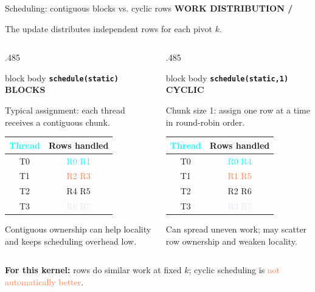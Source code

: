 \documentclass[aspectratio=169,10pt]{beamer}
\newcommand{\eyebrow}[1]{%
  {\color{cyan}\scriptsize\bfseries #1}\par\vspace{.08cm}}
\newcommand{\smallmuted}[1]{{\color{muted}\small #1}}
\newcommand{\cardtitle}[2]{%
  {\color{#1}\bfseries\small #2}\par\vspace{.08cm}}
\begin{document}
\begin{frame}{Scheduling: contiguous blocks vs. cyclic rows}
  \eyebrow{WORK DISTRIBUTION \quad / }
  {\smallmuted{The update distributes independent rows for each pivot $k$.}}
  \vspace{.1cm}

  \begin{columns}[T,onlytextwidth]
    \begin{column}{.485\textwidth}
      \begin{beamercolorbox}[rounded=true,sep=.2cm,wd=\textwidth]{block body}
        \cardtitle{cyan}{\texttt{schedule(static)} \quad BLOCKS}
        \smallmuted{Typical assignment: each thread receives a contiguous chunk.}
        \vspace{.06cm}
        \begin{center}
          \begin{tabular}{c|c}
            \textcolor{cyan}{Thread} & Rows handled \\\midrule
            T0 & \textcolor{cyan}{R0 \quad R1}\\
            T1 & \textcolor{coral}{R2 \quad R3}\\
            T2 & \textcolor{mint}{R4 \quad R5}\\
            T3 & \textcolor{lavender}{R6 \quad R7}
          \end{tabular}
        \end{center}
        \small Contiguous ownership can help locality and keeps scheduling
        overhead low.
      \end{beamercolorbox}
    \end{column}
    \begin{column}{.485\textwidth}
      \begin{beamercolorbox}[rounded=true,sep=.2cm,wd=\textwidth]{block body}
        \cardtitle{coral}{\texttt{schedule(static,1)} \quad CYCLIC}
        \smallmuted{Chunk size 1: assign one row at a time in round-robin order.}
        \vspace{.06cm}
        \begin{center}
          \begin{tabular}{c|c}
            \textcolor{cyan}{Thread} & Rows handled \\\midrule
            T0 & \textcolor{cyan}{R0 \quad R4}\\
            T1 & \textcolor{coral}{R1 \quad R5}\\
            T2 & \textcolor{mint}{R2 \quad R6}\\
            T3 & \textcolor{lavender}{R3 \quad R7}
          \end{tabular}
        \end{center}
        \small Can spread uneven work; may scatter row ownership and weaken
        locality.
      \end{beamercolorbox}
    \end{column}
  \end{columns}
  \vspace{.06cm}
  \centering\small
  \textbf{For this kernel:} rows do similar work at fixed $k$; cyclic
  scheduling is \textcolor{coral}{not automatically better}.
\end{frame}
\end{document}
